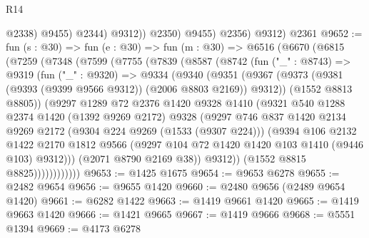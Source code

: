 \begin{lexlean}{R14}
\begin{coremodule}
                      @2338)
                    @9455)
                  @2344)
                @9312))
            @2350)
          @9455)
        @2356)
      @9312)
    @2361
@9652 := fun (s : @30) =>
  fun (e : @30) =>
  fun (m : @30) =>
  @6516
    (@6670
      (@6815
        (@7259
          (@7348
            (@7599
              (@7755
                (@7839
                  (@8587
                    (@8742
                      (fun ("_" : @8743) =>
                      @9319
                        (fun ("_" : @9320) =>
                        @9334
                          (@9340
                            (@9351
                              (@9367
                                (@9373
                                  (@9381 (@9393 (@9399 @9566 @9312)) (@2006 @8803 @2169))
                                  @9312))
                              (@1552 @8813 @8805))
                            (@9297
                              @1289
                              @72
                              @2376
                              @1420
                              @9328
                              @1410
                              (@9321
                                @540
                                @1288
                                @2374
                                @1420
                                (@1392 @9269 @2172)
                                @9328
                                (@9297
                                  @746
                                  @837
                                  @1420
                                  @2134
                                  @9269
                                  @2172
                                  (@9304 @224 @9269 (@1533 (@9307 @224)))
                                  (@9394
                                    @106
                                    @2132
                                    @1422
                                    @2170
                                    @1812
                                    @9566
                                    (@9297 @104 @72 @1420 @1420 @103 @1410 (@9446 @103) @9312)))
                                (@2071 @8790 @2169 @38))
                              @9312))
                          (@1552 @8815 @8825))))))))))))
@9653 := @1425 @1675
@9654 := @9653 @6278
@9655 := @2482 @9654
@9656 := @9655 @1420
@9660 := @2480 @9656 (@2489 @9654 @1420)
@9661 := @6282 @1422
@9663 := @1419 @9661 @1420
@9665 := @1419 @9663 @1420
@9666 := @1421 @9665
@9667 := @1419 @9666
@9668 := @5551 @1394
@9669 := @4173 @6278

\end{coremodule}
\end{lexlean}
